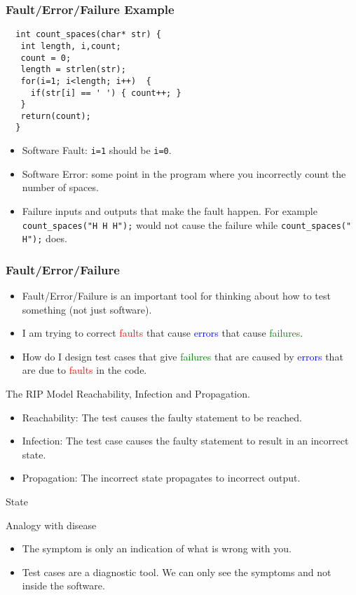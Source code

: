 \documentclass{beamer}
\begin{document}
\begin{frame}[fragile]
  \frametitle{Fault/Error/Failure Example}
\begin{lstlisting}
  int count_spaces(char* str) {
   int length, i,count;
   count = 0;
   length = strlen(str);
   for(i=1; i<length; i++)  { 
     if(str[i] == ' ') { count++; }
   }
   return(count);
  }
\end{lstlisting}
  \begin{itemize}
  \item Software Fault: {\tt i=1} should be {\tt i=0}.
  \item Software Error: some point in the program where you
    incorrectly count the number of spaces.
  \item Failure  inputs and outputs that make the fault happen. For
    example {\tt count\_spaces("H H H");} would not cause the failure
    while {\tt count\_spaces(" H");} does.
  \end{itemize}
\end{frame}
\begin{frame}
  \frametitle{Fault/Error/Failure}
  \begin{itemize}
  \item Fault/Error/Failure is an important tool for thinking about how to
    test something (not just software).
  \item I am trying to correct \textcolor{red}{faults} that cause
    \textcolor{blue}{errors} that cause \textcolor{green}{failures}.
  \item How do I design test cases that give  \textcolor{green}{failures} that
    are caused by  \textcolor{blue}{errors} that are due to
    \textcolor{red}{faults} in the code.
  \end{itemize}
\end{frame}


\begin{frame}{The RIP Model}
 Reachability,  Infection and Propagation.
  \begin{itemize}
  \item Reachability: The test causes the faulty statement to be
    reached.
  \item Infection: The test case causes the faulty statement to result
    in an incorrect state.
  \item Propagation: The incorrect state propagates to incorrect output.
    \end{itemize}
  \end{frame}
  \begin{frame}{State}
    
  \end{frame}
  \begin{frame}{Analogy with disease}
    \begin{itemize}
    \item The symptom is only an indication of what is wrong with you.
    \item Test cases are a diagnostic tool. We can only see the
      symptoms and not inside the software. 
    \end{itemize}    
  \end{frame}
\end{document}
